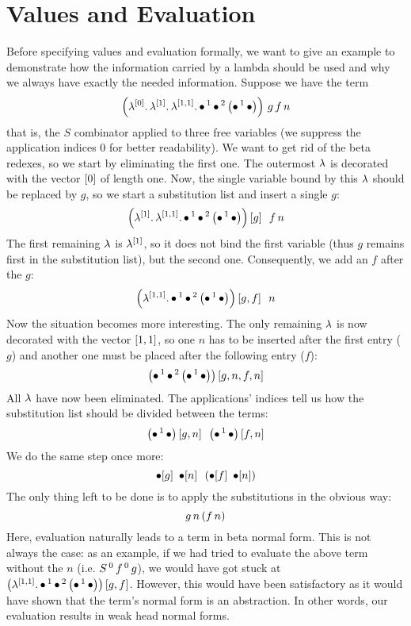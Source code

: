 \documentclass[submission,copyright,creativecommons]{eptcs}
\begin{document}
\section{Values and Evaluation} 
\label{sec:values}

Before specifying values and evaluation formally, we want to give an example to demonstrate how the information carried by a lambda should be used and why we always have exactly the needed information. Suppose we have the term
\[
\left(\lambda ^{[0]} . \, \lambda ^{[1]} . \, \lambda ^{[1,1]} . \, \mathord{\bullet} \, ^{1} \, \mathord{\bullet} \, ^{2} \, {\left( \mathord{\bullet} \, ^{1} \, \mathord{\bullet} \right)}\right) \, g \, f \, n 
\]
that is, the $S$ combinator applied to three free variables
(we suppress the application indices $0$ for better readability). We want to get rid of the beta redexes, so we start by eliminating the first one. The outermost $\lambda$ is decorated with the vector $[0]$ of length one. Now, the single variable bound by this $\lambda$ should be replaced by $g$, so we start a substitution list and insert a single $g$:
\[
\left(\lambda ^{[1]} . \, \lambda ^{[1,1]} . \, \mathord{\bullet} \, ^{1} \, \mathord{\bullet} \, ^{2} \, {\left( \mathord{\bullet} \, ^{1} \, \mathord{\bullet} \right)}\right) \left[ g \right] \ \, f \, n
\]
The first remaining $\lambda$ is $\lambda^{[1]}$, so it does not bind the first variable (thus $g$ remains first in the substitution list), but the second one. Consequently, we add an $f$ after the $g$:
\[
\left(\lambda ^{[1,1]} . \, \mathord{\bullet} \, ^{1} \, \mathord{\bullet} \, ^{2} \, {\left( \mathord{\bullet} \, ^{1} \, \mathord{\bullet} \right)}\right)  \left[ g, f \right] \ \, n
\]
Now the situation becomes more interesting. The only remaining $\lambda$ is now decorated with the vector $[1,1]$, so one $n$ has to be inserted after the first entry ($g$) and another one must be placed after the following entry ($f$):
\[
\left(\mathord{\bullet} \, ^{1} \, \mathord{\bullet} \, ^{2} \, {\left( \mathord{\bullet} \, ^{1} \, \mathord{\bullet} \right)}\right)  \left[ g, n, f, n \right]
\]
All $\lambda$ have now been eliminated. The applications' indices tell us how the substitution list should be divided between the terms:
\[
\left(\mathord{\bullet} \, ^{1} \, \mathord{\bullet}\right)\left[ g, n \right] \ \, \left(\mathord{\bullet} \, ^{1} \, \mathord{\bullet}\right) \left[ f, n \right]
\]
We do the same step once more:
\[
\mathord{\bullet}[g]  \ \, \mathord{\bullet}[n]  \ \, \left(\mathord{\bullet}[f]  \ \, \mathord{\bullet}[n]\right)
\]
The only thing left to be done is to apply the substitutions in the obvious way:
\[
g \, n  \, (f \, n)
\]
Here, evaluation naturally leads to a term in beta normal form. This is not always the case: as an example, if we had tried to evaluate the above term without the $n$ (i.e. $S \, ^{0} \, f \, ^{0} \, g$), we would have got stuck at $\left(\lambda ^{[1,1]} . \, \mathord{\bullet} \, ^{1} \, \mathord{\bullet} \, ^{2} \, {\left( \mathord{\bullet} \, ^{1} \, \mathord{\bullet} \right)}\right)  \left[ g, f \right]$. However, this would have been satisfactory as it would have shown that the term's normal form is an abstraction. In other words, our evaluation results in weak head normal forms.
\end{document}
